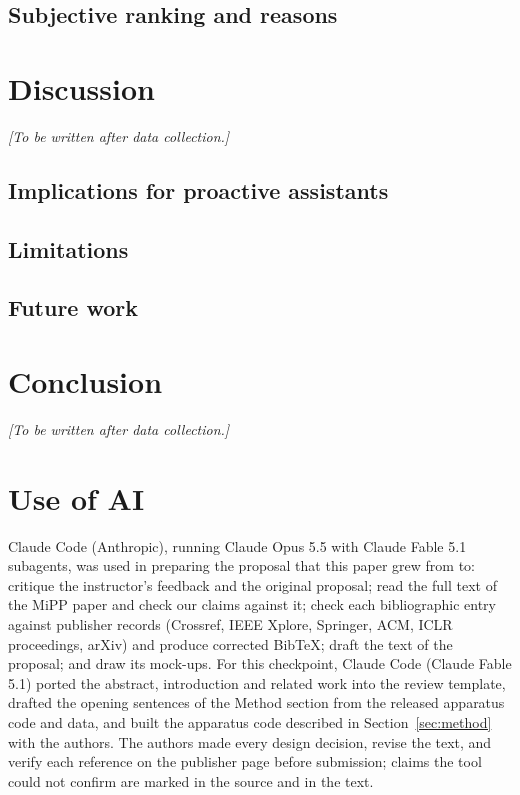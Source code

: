 \documentclass[manuscript,review]{acmart}
\newcommand{\todo}[1]{{\itshape\color{black!60}[#1]}}
\begin{document}
\subsection{Subjective ranking and reasons}

\section{Discussion}
\label{sec:discussion}
\todo{To be written after data collection.}

\subsection{Implications for proactive assistants}
\subsection{Limitations}
\subsection{Future work}

\section{Conclusion}
\label{sec:conclusion}
\todo{To be written after data collection.}

\section*{Use of AI}

Claude Code (Anthropic), running Claude Opus 5.5 with Claude Fable 5.1
subagents, was used in preparing the proposal that this paper grew from
to: critique the instructor's feedback and the original proposal; read the
full text of the MiPP paper and check our claims against it; check each
bibliographic entry against publisher records (Crossref, IEEE Xplore,
Springer, ACM, ICLR proceedings, arXiv) and produce corrected BibTeX; draft
the text of the proposal; and draw its mock-ups. For this checkpoint,
Claude Code (Claude Fable 5.1) ported the abstract, introduction and
related work into the review template, drafted the opening sentences of
the Method section from the released apparatus code and data, and built
the apparatus code described in Section~\ref{sec:method} with the authors.
The authors made every design decision, revise the text, and verify each
reference on the publisher page before submission; claims the tool could
not confirm are marked in the source and in the text.



\end{document}
